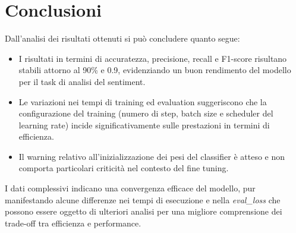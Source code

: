 \documentclass[a4paper,12pt]{article}
\begin{document}
\section{Conclusioni}
Dall'analisi dei risultati ottenuti si può concludere quanto segue:
\begin{itemize}
    \item I risultati in termini di accuratezza, precisione, recall e F1-score risultano stabili attorno al 90\% e 0.9, evidenziando un buon rendimento del modello per il task di analisi del sentiment.
    \item Le variazioni nei tempi di training ed evaluation suggeriscono che la configurazione del training (numero di step, batch size e scheduler del learning rate) incide significativamente sulle prestazioni in termini di efficienza.
    \item Il warning relativo all’inizializzazione dei pesi del classifier è atteso e non comporta particolari criticità nel contesto del fine tuning.
\end{itemize}
I dati complessivi indicano una convergenza efficace del modello, pur manifestando alcune differenze nei tempi di esecuzione e nella \textit{eval\_loss} che possono essere oggetto di ulteriori analisi per una migliore comprensione dei trade-off tra efficienza e performance.
\end{document}
